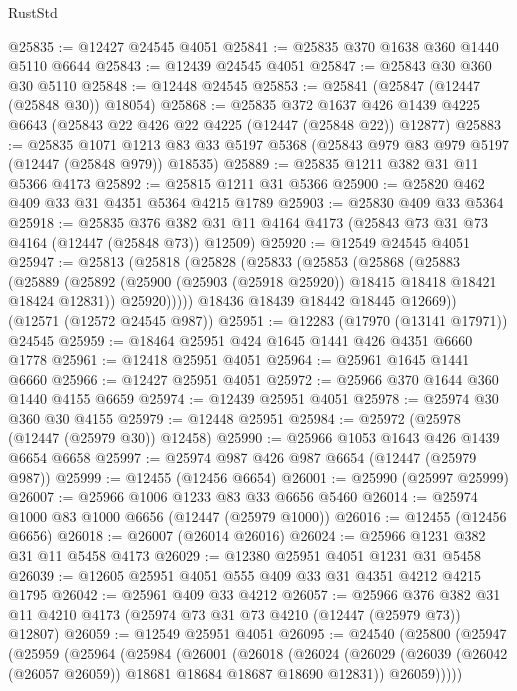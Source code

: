 \begin{lexlean}{RustStd}
\begin{coremodule}
@25835 := @12427 @24545 @4051
@25841 := @25835 @370 @1638 @360 @1440 @5110 @6644
@25843 := @12439 @24545 @4051
@25847 := @25843 @30 @360 @30 @5110
@25848 := @12448 @24545
@25853 := @25841 (@25847 (@12447 (@25848 @30)) @18054)
@25868 := @25835
    @372
    @1637
    @426
    @1439
    @4225
    @6643
    (@25843 @22 @426 @22 @4225 (@12447 (@25848 @22)) @12877)
@25883 := @25835
    @1071
    @1213
    @83
    @33
    @5197
    @5368
    (@25843 @979 @83 @979 @5197 (@12447 (@25848 @979)) @18535)
@25889 := @25835 @1211 @382 @31 @11 @5366 @4173
@25892 := @25815 @1211 @31 @5366
@25900 := @25820 @462 @409 @33 @31 @4351 @5364 @4215 @1789
@25903 := @25830 @409 @33 @5364
@25918 := @25835
    @376
    @382
    @31
    @11
    @4164
    @4173
    (@25843 @73 @31 @73 @4164 (@12447 (@25848 @73)) @12509)
@25920 := @12549 @24545 @4051
@25947 := @25813
    (@25818
      (@25828
        (@25833
          (@25853
            (@25868
              (@25883
                (@25889
                  (@25892 (@25900 (@25903 (@25918 @25920)) @18415 @18418 @18421 @18424 @12831))
                  @25920)))))
        @18436
        @18439
        @18442
        @18445
        @12669))
    (@12571 (@12572 @24545 @987))
@25951 := @12283 (@17970 (@13141 @17971)) @24545
@25959 := @18464 @25951 @424 @1645 @1441 @426 @4351 @6660 @1778
@25961 := @12418 @25951 @4051
@25964 := @25961 @1645 @1441 @6660
@25966 := @12427 @25951 @4051
@25972 := @25966 @370 @1644 @360 @1440 @4155 @6659
@25974 := @12439 @25951 @4051
@25978 := @25974 @30 @360 @30 @4155
@25979 := @12448 @25951
@25984 := @25972 (@25978 (@12447 (@25979 @30)) @12458)
@25990 := @25966 @1053 @1643 @426 @1439 @6654 @6658
@25997 := @25974 @987 @426 @987 @6654 (@12447 (@25979 @987))
@25999 := @12455 (@12456 @6654)
@26001 := @25990 (@25997 @25999)
@26007 := @25966 @1006 @1233 @83 @33 @6656 @5460
@26014 := @25974 @1000 @83 @1000 @6656 (@12447 (@25979 @1000))
@26016 := @12455 (@12456 @6656)
@26018 := @26007 (@26014 @26016)
@26024 := @25966 @1231 @382 @31 @11 @5458 @4173
@26029 := @12380 @25951 @4051 @1231 @31 @5458
@26039 := @12605 @25951 @4051 @555 @409 @33 @31 @4351 @4212 @4215 @1795
@26042 := @25961 @409 @33 @4212
@26057 := @25966
    @376
    @382
    @31
    @11
    @4210
    @4173
    (@25974 @73 @31 @73 @4210 (@12447 (@25979 @73)) @12807)
@26059 := @12549 @25951 @4051
@26095 := @24540
    (@25800
      (@25947
        (@25959
          (@25964
            (@25984
              (@26001
                (@26018
                  (@26024
                    (@26029 (@26039 (@26042 (@26057 @26059)) @18681 @18684 @18687 @18690 @12831))
                    @26059)))))

\end{coremodule}
\end{lexlean}
